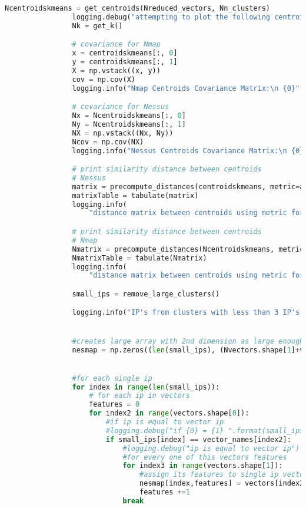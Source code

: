 \begin{lstlisting}[language=python]
                Ncentroidskmeans = get_centroids(Nreduced_vectors, Nn_clusters)
                logging.debug("attempting to plot the following centroids:\n " + str(Ncentroidskmeans) + "\n\n")
                Nk = get_k()

                # covariance for Nmap
                x = centroidskmeans[:, 0]
                y = centroidskmeans[:, 1]
                X = np.vstack((x, y))
                cov = np.cov(X)
                logging.info("Nmap Centroids Covariance Matrix:\n {0}".format(cov))

                # covariance for Nessus
                Nx = Ncentroidskmeans[:, 0]
                Ny = Ncentroidskmeans[:, 1]
                NX = np.vstack((Nx, Ny))
                Ncov = np.cov(NX)
                logging.info("Nessus Centroids Covariance Matrix:\n {0}".format(Ncov))

                # print similarity distance between centroids
                # Nessus
                matrix = precompute_distances(centroidskmeans, metric=args.metric)
                matrixTable = tabulate(matrix)
                logging.info(
                    "distance matrix between centroids using metric for Nmap: {0} :\n{1}".format(args.metric, matrixTable))

                # print similarity distance between centroids
                # Nmap
                Nmatrix = precompute_distances(Ncentroidskmeans, metric=args.metric)
                NmatrixTable = tabulate(Nmatrix)
                logging.info(
                    "distance matrix between centroids using metric for Nessus: {0} :\n{1}".format(args.metric, NmatrixTable))

                small_ips = remove_large_clusters()

                logging.info("IP's from clusters with less than 3 IP's:\n {0}".format((small_ips)))


                #creates large array with 2nd dimension as large enough to hold both feature vectors
                nesmap = np.zeros((len(small_ips), (Nvectors.shape[1]+vectors.shape[1])))


                #for each single ip
                for index in range(len(small_ips)):
                    # for each ip in vectors
                    features = 0
                    for index2 in range(vectors.shape[0]):
                        #if ip is equal to vector ip
                        #logging.debug("if {0} = {1} ".format(small_ips[index], vector_names[index2]))
                        if small_ips[index] == vector_names[index2]:
                            #logging.debug("ip is equal to vector ip")
                            #for every one of this vectors features
                            for index3 in range(vectors.shape[1]):
                                #assign its features to single ip vector
                                nesmap[index,features] = vectors[index2, index3]
                                features +=1
                            break


\end{lstlisting}
